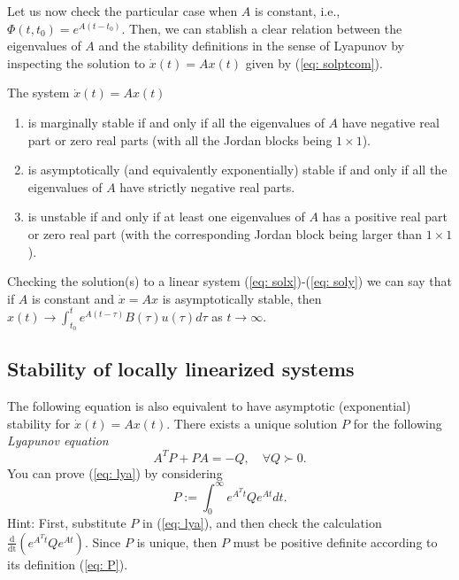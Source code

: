 \documentclass[11pt,a4paper,titlepage]{article}
\begin{document}

Let us now check the particular case when $A$ is constant, i.e., $\Phi(t,t_0) = e^{A(t-t_0)}$. Then, we can stablish a clear relation between the eigenvalues of $A$ and the stability definitions in the sense of Lyapunov by inspecting the solution to $\dot x(t) = Ax(t)$ given by (\ref{eq: solptcom}).


The system $\dot x(t) = Ax(t)$
\begin{enumerate}
	\item is marginally stable if and only if all the eigenvalues of $A$ have negative real part or zero real parts (with all the Jordan blocks being $1\times 1$).
	\item is asymptotically (and equivalently exponentially) stable if and only if all the eigenvalues of $A$ have strictly negative real parts.
	\item is unstable if and only if at least one eigenvalues of $A$ has a positive real part or zero real part (with the corresponding Jordan block being larger than $1\times 1$).
\end{enumerate}

Checking the solution(s) to a linear system (\ref{eq: solx})-(\ref{eq: soly}) we can say that if $A$ is constant and $\dot x = Ax$ is asymptotically stable, then $x(t) \to \int_{t_0}^t e^{A(t-\tau)}B(\tau)u(\tau)d\tau$ as $t\to\infty$. 

\subsection{Stability of locally linearized systems}
The following equation is also equivalent to have asymptotic (exponential) stability for $\dot x(t) = Ax(t)$. There exists a unique solution $P$ for the following \emph{Lyapunov equation}
\begin{equation}
A^TP + PA = -Q, \quad \forall Q \succ 0.
	\label{eq: lya}
\end{equation}
You can prove (\ref{eq: lya}) by considering
\begin{equation}
	P:= \int_0^\infty e^{A^Tt}Qe^{At}dt.
	\label{eq: P}
\end{equation}
Hint: First, substitute $P$ in (\ref{eq: lya}), and then check the calculation $\frac{\mathrm{d}}{\mathrm{dt}}\left(e^{A^Tt}Qe^{At}\right)$. Since $P$ is unique, then $P$ must be positive definite according to its definition (\ref{eq: P}).
\end{document}
